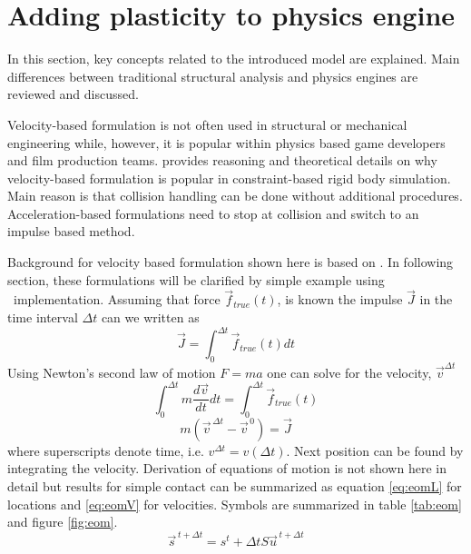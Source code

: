 \section{Adding plasticity to physics engine}

In this section, key concepts related to the introduced model are explained. Main differences between 
traditional structural analysis and physics engines are reviewed and discussed.

Velocity-based formulation is not often used in structural or mechanical engineering while, 
however, it is popular within physics based game developers and film production teams.
 \citet[p.~45]{erleben.thesis} provides reasoning and theoretical details on why 
velocity-based formulation is  popular in constraint-based rigid body simulation. 
Main reason is that collision handling can be done without additional procedures.
Acceleration-based formulations need to stop at collision and switch to an impulse based method.

Background
for velocity based formulation shown here is based on  \citet[p.~45-50]{erleben.thesis}.
In following section, these formulations will be clarified by simple example using \bullet\ implementation.
Assuming that force $\vec{f}_{true}(t)$, is known the impulse $\vec{J}$
in the time interval $\Delta t $ can we written as
\begin{equation} \label{eq:impulseIntegral}
\vec{J} = \int_{0}^{\Delta t} \vec{f}_{true}(t) dt
\end{equation}
Using Newton's second law of motion $F=ma$ one can solve for the velocity, $\vec{v}^{\Delta t}$
\begin{equation} \label{eq:impulseIntegraWithNewton}
\int_{0}^{\Delta t} m \frac{d\vec{v}}{dt}dt= \int_{0}^{\Delta t} \vec{f}_{true}(t)
\end{equation}
\begin{equation} \label{eq:impulse}
m(\vec{v}^{\, \Delta t} - \vec{v}^{\, 0})=\vec{J}
\end{equation}
where superscripts denote time, i.e. ${v}^{\Delta t}=v(\Delta t)$. Next position can be found
by integrating the velocity.
Derivation of equations of motion is not shown here in detail but results 
for simple contact can be summarized as
equation \ref{eq:eomL} for locations and \ref{eq:eomV} for velocities.
Symbols are summarized in table \ref{tab:eom} and figure \ref{fig:eom}.
\begin{equation} \label{eq:eomL} %
\vec{s}^{\, t+\Delta t} = s^{t}+\Delta t S \vec{u}^{\, t+\Delta t}
\end{equation}

